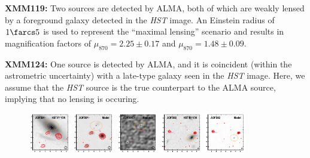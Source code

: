 \documentclass[iop]{emulateapj}
\begin{document}
{\bf XMM119:} Two sources are detected by ALMA, both of which are weakly
lensed by a foreground galaxy detected in the {\it HST} image.  An Einstein
radius of $1\farcs5$ is used to represent the ``maximal lensing'' scenario and
results in magnification factors of $\mu_{870} = 2.25 \pm 0.17$ and $\mu_{870}
= 1.48 \pm 0.09$.

{\bf XMM124:} One source is detected by ALMA, and it is coincident (within the
astrometric uncertainty) with a late-type galaxy seen in the {\it HST} image.
Here, we assume that the {\it HST} source is the true counterpart to the ALMA
source, implying that no lensing is occuring.  

\begin{figure}[!tbp] 
    \begin{centering}
\includegraphics[width=0.162\textwidth]{../Figures/modelfit/ADFS01_optical_bestfit.pdf}
\includegraphics[width=0.162\textwidth]{../Figures/modelfit/ADFS01_model_bestfit.pdf}
\includegraphics[width=0.162\textwidth]{../Figures/modelfit/ADFS01_residual_bestfit.pdf}
\includegraphics[width=0.162\textwidth]{../Figures/modelfit/ADFS02_optical_bestfit.pdf}
\includegraphics[width=0.162\textwidth]{../Figures/modelfit/ADFS02_model_bestfit.pdf}

\end{centering}
\end{figure}
\end{document}
